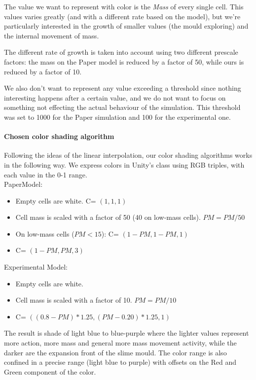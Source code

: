 The value we want to represent with color is the \textit{Mass} of every single cell. This values varies greatly (and with a different rate based on the model), but we're particularly interested in the growth of smaller values (the mould exploring) and the internal movement of mass.

The different rate of growth is taken into account using two different prescale factors: the mass on the Paper model is reduced by a factor of 50, while ours is reduced by a factor of 10.

We also don't want to represent any value exceeding a threshold since nothing interesting happens after a certain value, and we do not want to focus on something not effecting the actual behaviour of the simulation. This threshold was set to 1000 for the Paper simulation and 100 for the experimental one.

\paragraph{Chosen color shading algorithm}

Following the ideas of the linear interpolation, our color shading algorithms works in the following way. We express colors in Unity's class using RGB triples, with each value in the 0-1 range.\\

PaperModel:

\begin{itemize}
	\item Empty cells are white. C= $(1,1,1)$
	\item Cell mass is scaled with a factor of 50 (40 on low-mass cells). $PM = PM/50$
	\item On low-mass cells ($PM < 15$): C= $(1-PM,1-PM,1)$
	\item C= $(1-PM,PM,3)$
\end{itemize}

Experimental Model:

\begin{itemize}
	\item Empty cells are white.
	\item Cell mass is scaled with a factor of 10. $PM = PM/10$
	\item C= $((0.8-PM)*1.25,(PM-0.20)*1.25,1)$
\end{itemize}

The result is shade of light blue to blue-purple where the lighter values represent more action, more mass and general more mass movement activity, while the darker are the expansion front of the slime mould. The color range is also confined in a precise range (light blue to purple) with offsets on the Red and Green component of the color.

